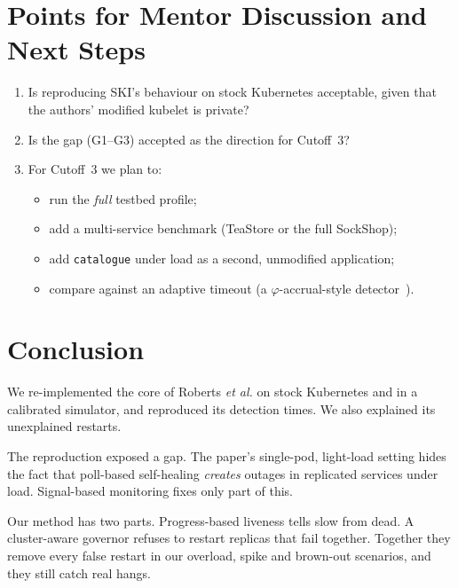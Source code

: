 \documentclass[conference]{IEEEtran}
\begin{document}
\section{Points for Mentor Discussion and Next Steps}
\begin{enumerate}
\item Is reproducing SKI's behaviour on stock Kubernetes acceptable,
  given that the authors' modified kubelet is private?
\item Is the gap (G1--G3) accepted as the direction for Cutoff~3?
\item For Cutoff~3 we plan to:
  \begin{itemize}
  \item run the \emph{full} testbed profile;
  \item add a multi-service benchmark (TeaStore or the full SockShop);
  \item add \texttt{catalogue} under load as a second, unmodified
    application;
  \item compare against an adaptive timeout (a $\varphi$-accrual-style
    detector~\cite{hayashibara2004}).
  \end{itemize}
\end{enumerate}

\section{Conclusion}
We re-implemented the core of Roberts \emph{et al.} on stock Kubernetes
and in a calibrated simulator, and reproduced its detection times. We
also explained its unexplained restarts.

The reproduction exposed a gap. The paper's single-pod, light-load
setting hides the fact that poll-based self-healing \emph{creates}
outages in replicated services under load. Signal-based monitoring
fixes only part of this.

Our method has two parts. Progress-based liveness tells slow from dead.
A cluster-aware governor refuses to restart replicas that fail together.
Together they remove every false restart in our overload, spike and
brown-out scenarios, and they still catch real hangs.

\appendices
\end{document}
